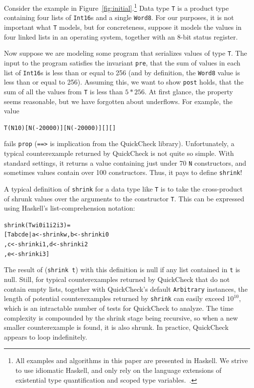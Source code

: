 \documentclass[10pt]{sigplanconf}
\newenvironment{code}{\begin{alltt}\small}{\end{alltt}}
\newcommand{\ttp}[1]{\texttt{#1}}
\begin{document}
Consider the example in Figure~\ref{fig:initial}.\footnote{All examples and
  algorithms in this paper are presented in Haskell.  We strive to use idiomatic
  Haskell, and only rely on the language extensions of existential type
  quantification and scoped type variables.~\cite{haskell98}.}  Data type
\ttp{T} is a product type containing four lists of \ttp{Int16}s and a single
\ttp{Word8}.  For our purposes, it is not important what \ttp{T} models, but
for concreteness, suppose it models the values in four linked lists in an
operating system, together with an 8-bit status register.

Now suppose we are modeling some program that serializes values of type \ttp{T}.
The input to the program satisfies the invariant \ttp{pre}, that the sum of
values in each list of \ttp{Int16}s is less than or equal to 256 (and by
definition, the \ttp{Word8} value is less than or equal to 256).  Assuming this,
we want to show \ttp{post} holds, that the sum of all the values from \ttp{T} is
less than $5 * 256$.  At first glance, the property seems reasonable, but we
have forgotten about underflows.  For example, the value
%
\begin{code}
T (N 10) [N (-20000)] [N (-20000)] [] []
\end{code}
%
fails \ttp{prop} (\ttp{==>} is implication from the QuickCheck library).
Unfortunately, a typical counterexample returned by QuickCheck is not quite so
simple.  With standard settings, it returns a value containing just under 70
\ttp{N} constructors, and sometimes values contain over 100 constructors.  Thus,
it pays to define \ttp{shrink}!

A typical definition of \ttp{shrink} for a data type like \ttp{T} is to take the
cross-product of shrunk values over the arguments to the constructor \ttp{T}.
This can be expressed using Haskell's list-comprehension notation:
%
\begin{code}
shrink (T w i0 i1 i2 i3) =
  [ T a b c d e | a <- shrink w,  b <- shrink i0
                , c <- shrink i1, d <- shrink i2
                , e <- shrink i3 ]
\end{code}
%
\noindent
The result of (\ttp{shrink t}) with this definition is null if any list
contained in \ttp{t} is null.  Still, for typical counterexamples returned by
QuickCheck that do not contain empty lists, together with QuickCheck's default
\ttp{Arbitrary} instances, the length of potential counterexamples returned by
\ttp{shrink} can easily exceed $10^{10}$, which is an intractable number of
tests for QuickCheck to analyze.  The time complexity is compounded by the
shrink stage being recursive, so when a new smaller counterexample is found, it
is also shrunk.  In practice, QuickCheck appears to loop indefinitely.
\end{document}
